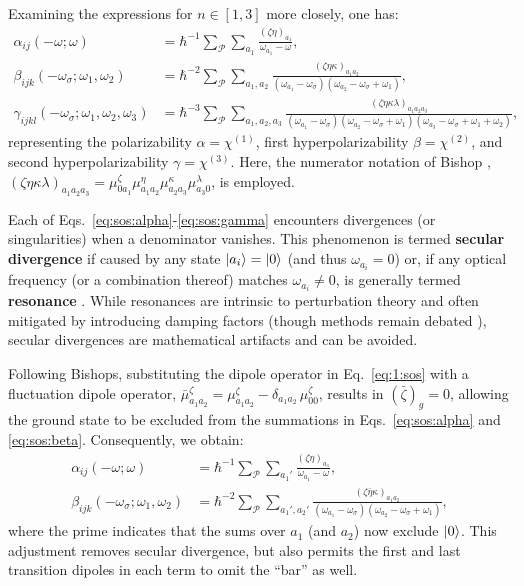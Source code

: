 \documentclass[12pt,a4paper]{article}
\begin{document}
Examining the expressions for $n\in[1,3]$ more closely, one has:
\begin{align}
	\alpha_{ij}(-\omega;\omega) &= \hbar^{-1} \sum_\mathcal{P} \sum_{a_1} \frac{(\zeta\eta)_{a_1}}{\omega_{a_1} - \omega},\label{eq:sos:alpha}\\
	\beta_{ijk}(-\omega_\sigma; \omega_1, \omega_2) &= \hbar^{-2} \sum_\mathcal{P} \sum_{a_1,a_2} \frac{(\zeta\eta\kappa)_{a_1 a_2}}{(\omega_{a_1} - \omega_\sigma)(\omega_{a_2} - \omega_\sigma + \omega_1)},\label{eq:sos:beta}\\
	\gamma_{ijkl}(-\omega_\sigma; \omega_1, \omega_2, \omega_3) &= \hbar^{-3} \sum_\mathcal{P} \sum_{a_1, a_2, a_3} \frac{(\zeta\eta\kappa\lambda)_{a_1 a_2 a_3}}{(\omega_{a_1} - \omega_\sigma)(\omega_{a_2} - \omega_\sigma + \omega_1)(\omega_{a_3} - \omega_\sigma + \omega_1 + \omega_2)},\label{eq:sos:gamma}
\end{align}
representing the polarizability $\alpha = \chi^{(1)}$, first hyperpolarizability $\beta = \chi^{(2)}$, and second hyperpolarizability $\gamma = \chi^{(3)}$. Here, the numerator notation of Bishop \cite{bishopExplicitNondivergentFormulas1994}, $(\zeta\eta\kappa\lambda)_{a_1 a_2 a_3} = \mu_{0 a_1}^\zeta \mu_{a_1 a_2}^\eta \mu_{a_2 a_3}^\kappa \mu_{a_3 0}^\lambda$, is employed.

Each of Eqs.~\eqref{eq:sos:alpha}-\eqref{eq:sos:gamma} encounters divergences (or singularities) when a denominator vanishes. This phenomenon is termed \textbf{secular divergence} if caused by any state $\ket{a_i} = \ket{0}$ (and thus $\omega_{a_i} = 0$) or, if any optical frequency (or a combination thereof) matches $\omega_{a_i} \neq 0$, is generally termed \textbf{resonance} \cite{bishopExplicitNondivergentFormulas1994}. While resonances are intrinsic to perturbation theory and often mitigated by introducing damping factors (though methods remain debated \cite{campoPracticalModelFirst2012a}), secular divergences are mathematical artifacts and can be avoided. 

Following Bishops, substituting the dipole operator in Eq.~\eqref{eq:1:sos} with a fluctuation dipole operator, $\bar{\mu}^\zeta_{a_1 a_2} = \mu^\zeta_{a_1 a_2} - \delta_{a_1 a_2}\, \mu_{00}^\zeta$, results in $(\bar{\zeta})_g = 0$, allowing the ground state to be excluded from the summations in Eqs.~\eqref{eq:sos:alpha} and \eqref{eq:sos:beta}. Consequently, we obtain:
\begin{align}
	\alpha_{ij}(-\omega; \omega) &= \hbar^{-1} \sum_\mathcal{P} \sum_{a_1'} \frac{(\zeta\eta)_{a_1}}{\omega_{a_1} - \omega},\label{eq:fluct:alpha}\\
	\beta_{ijk}(-\omega_\sigma; \omega_1, \omega_2) &= \hbar^{-2} \sum_\mathcal{P} \sum_{a_1', a_2'} \frac{(\zeta\bar{\eta}\kappa)_{a_1 a_2}}{(\omega_{a_1} - \omega_\sigma)(\omega_{a_2} - \omega_\sigma + \omega_1)},\label{eq:fluct:beta}
\end{align}
where the prime indicates that the sums over $a_1$ (and $a_2$) now exclude $\ket{0}$. This adjustment removes secular divergence, but also permits the first and last transition dipoles in each term to omit the ``bar'' as well.
\end{document}
